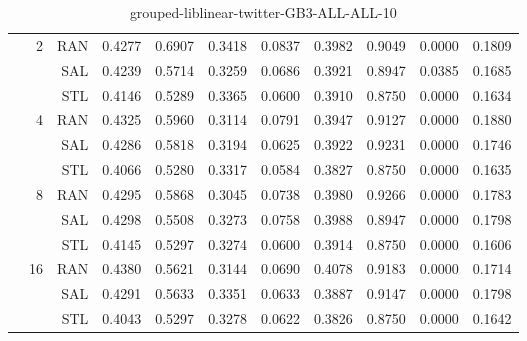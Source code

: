 \begin{center}
\begin{table}[htbp]
\begin{center}
\begin{tabular}{ | r | r | r | r | r | r | r | r | r | r | r |}
 & \multirow{3}{*}{2} & RAN & 0.4277 & 0.6907 & 0.3418 & 0.0837 & 0.3982 & 0.9049 & 0.0000 & 0.1809\\ \cline{3-11}
 &   & SAL & 0.4239 & 0.5714 & 0.3259 & 0.0686 & 0.3921 & 0.8947 & 0.0385 & 0.1685\\ \cline{3-11}
 &   & STL & 0.4146 & 0.5289 & 0.3365 & 0.0600 & 0.3910 & 0.8750 & 0.0000 & 0.1634\\ \cline{2-11}
 & \multirow{3}{*}{4} & RAN & 0.4325 & 0.5960 & 0.3114 & 0.0791 & 0.3947 & 0.9127 & 0.0000 & 0.1880\\ \cline{3-11}
 &   & SAL & 0.4286 & 0.5818 & 0.3194 & 0.0625 & 0.3922 & 0.9231 & 0.0000 & 0.1746\\ \cline{3-11}
 &   & STL & 0.4066 & 0.5280 & 0.3317 & 0.0584 & 0.3827 & 0.8750 & 0.0000 & 0.1635\\ \cline{2-11}
 & \multirow{3}{*}{8} & RAN & 0.4295 & 0.5868 & 0.3045 & 0.0738 & 0.3980 & 0.9266 & 0.0000 & 0.1783\\ \cline{3-11}
 &   & SAL & 0.4298 & 0.5508 & 0.3273 & 0.0758 & 0.3988 & 0.8947 & 0.0000 & 0.1798\\ \cline{3-11}
 &   & STL & 0.4145 & 0.5297 & 0.3274 & 0.0600 & 0.3914 & 0.8750 & 0.0000 & 0.1606\\ \cline{2-11}
 & \multirow{3}{*}{16} & RAN & 0.4380 & 0.5621 & 0.3144 & 0.0690 & 0.4078 & 0.9183 & 0.0000 & 0.1714\\ \cline{3-11}
 &   & SAL & 0.4291 & 0.5633 & 0.3351 & 0.0633 & 0.3887 & 0.9147 & 0.0000 & 0.1798\\ \cline{3-11}
 &   & STL & 0.4043 & 0.5297 & 0.3278 & 0.0622 & 0.3826 & 0.8750 & 0.0000 & 0.1642\\ \cline{2-11}
\hline
\end{tabular}
\caption{grouped-liblinear-twitter-GB3-ALL-ALL-10}
\end{center}
 \end{table}
\end{center}

